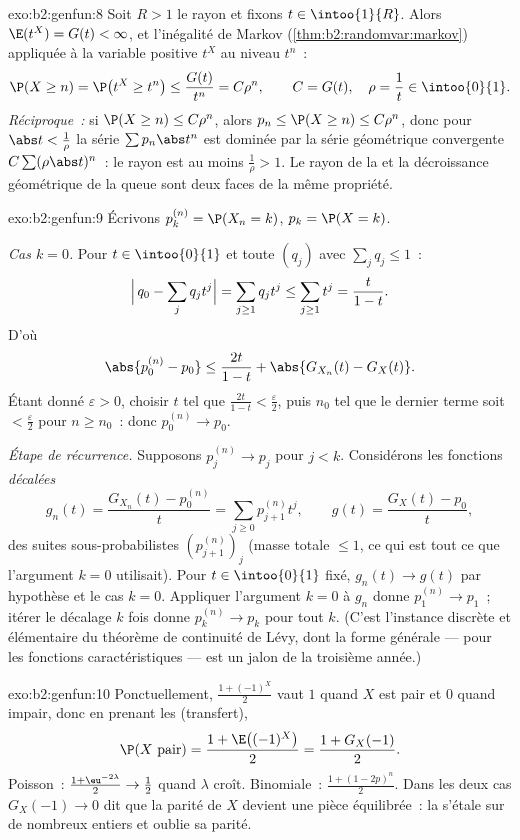 \begin{solution}{exo:b2:genfun:8}
Soit $R > 1$ le rayon et fixons $t \in \intoo{1}{R}$. Alors
$\E(t^X) = G(t) < \infty$, et l'inégalité de Markov
(\cref{thm:b2:randomvar:markov}) appliquée à la variable positive
$t^X$ au niveau $t^n$~:
\[
\P(X \geq n) = \P\bigl(t^X \geq t^n\bigr)
\leq \frac{G(t)}{t^n} = C\rho^n,
\qquad C = G(t),\quad \rho = \frac1t \in \intoo{0}{1}.
\]
\emph{Réciproque~:} si $\P(X \geq n) \leq C\rho^n$, alors $p_n \leq
\P(X \geq n) \leq C\rho^n$, donc pour $\abs t < \frac1\rho$ la
série $\sum p_n\abs t^n$ est dominée par la série géométrique
convergente $C\sum(\rho\abs t)^n$~: le rayon est au moins
$\frac1\rho > 1$. Le rayon de la  et la
décroissance géométrique de la queue sont deux faces de la même
propriété.
\end{solution}

\begin{solution}{exo:b2:genfun:9}
Écrivons $p_k^{(n)} = \P(X_n = k)$, $p_k = \P(X = k)$.

\emph{Cas $k = 0$.} Pour $t \in \intoo{0}{1}$ et toute 
$(q_j)$ avec $\sum_j q_j \leq 1$~:
\[
\Bigl|\,q_0 - \sum_j q_jt^j\Bigr|
= \sum_{j \geq 1} q_j t^j
\leq \sum_{j\geq1}t^j = \frac{t}{1 - t} .
\]
D'où
\[
\abs{p_0^{(n)} - p_0}
\leq \frac{2t}{1 - t}
+ \abs{G_{X_n}(t) - G_X(t)} .
\]
Étant donné $\varepsilon > 0$, choisir $t$ tel que $\frac{2t}{1-t} <
\frac\varepsilon2$, puis $n_0$ tel que le dernier terme soit $<
\frac\varepsilon2$ pour $n \geq n_0$~: donc $p_0^{(n)} \to p_0$.

\emph{Étape de récurrence.} Supposons $p_j^{(n)} \to p_j$ pour $j < k$.
Considérons les fonctions \emph{décalées}
\[
g_n(t) = \frac{G_{X_n}(t) - p^{(n)}_0}{t}
= \sum_{j\geq0} p^{(n)}_{j+1}t^j,
\qquad
g(t) = \frac{G_X(t) - p_0}{t} ,
\]
 des suites sous-probabilistes
$(p^{(n)}_{j+1})_j$ (masse totale $\leq 1$, ce qui est tout ce que
l'argument $k = 0$ utilisait). Pour $t \in \intoo{0}{1}$ fixé, $g_n(t)
\to g(t)$ par hypothèse et le cas $k = 0$. Appliquer l'argument $k =
0$ à $g_n$ donne $p_1^{(n)} \to p_1$~; itérer le décalage $k$ fois
donne $p_k^{(n)} \to p_k$ pour tout $k$. (C'est l'instance discrète et
élémentaire du théorème de continuité de Lévy, dont la forme générale
--- pour les fonctions caractéristiques --- est un jalon de la
troisième année.)
\end{solution}

\begin{solution}{exo:b2:genfun:10}
Ponctuellement, $\frac{1 + (-1)^X}{2}$ vaut $1$ quand $X$ est pair
et $0$ quand impair, donc en prenant les  (transfert),
\[
\P(X \text{ pair}) = \frac{1 + \E\bigl((-1)^X\bigr)}2 =
\frac{1 + G_X(-1)}2 .
\]
Poisson~: $\frac{1 + \eu^{-2\lambda}}2 \to \frac12$ quand
$\lambda$ croît. Binomiale~: $\frac{1 + (1 - 2p)^n}2$. Dans les deux
cas $G_X(-1) \to 0$ dit que la parité de $X$ devient une pièce
équilibrée~: la  s'étale sur de nombreux entiers et oublie sa
parité.
\end{solution}

